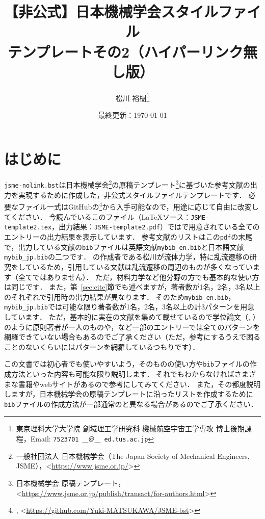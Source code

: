 \documentclass[a4paper,fleqn,uplatex,dvipdfmx]{jsarticle}
\title{【非公式】日本機械学会\BibTeX{}スタイルファイル \\ \JSMErepos テンプレートその2（ハイパーリンク無し版）}
\author{松川 裕樹\thanks{東京理科大学大学院 創域理工学研究科 機械航空宇宙工学専攻 博士後期課程，Email: \texttt{7523701 ＿＠＿ ed.tus.ac.jp}}}
\date{最終更新：\today}
\newcommand{\jsmefile}{\texttt{jsme-nolink.bst}}
\begin{document}
\maketitle
\thispagestyle{cover}

\vspace{-5mm}
\tableofcontents

\section{はじめに}
\label{sec:introduction}
\jsmefile は日本機械学会\footnote{一般社団法人 日本機械学会（The Japan Society of Mechanical Engineers, JSME），\textless\url{https://www.jsme.or.jp/}\textgreater}の原稿テンプレート\footnote{日本機械学会 原稿テンプレート，\textless\url{https://www.jsme.or.jp/publish/transact/for-authors.html}\textgreater}に基づいた参考文献の出力を実現するために作成した，非公式\BibTeX{}スタイルファイルテンプレートです．
必要なファイル一式はGitHubの\JSMErepos\footnote{\JSMErepos, \textless\url{https://github.com/Yuki-MATSUKAWA/JSME-bst}\textgreater}から入手可能なので，用途に応じて自由に改変してください．
今読んでいるこのファイル（\LaTeX{}ソース：\verb|JSME-template2.tex|，出力結果：\verb|JSME-template2.pdf|）では\BibTeX{}で用意されている全てのエントリーの出力結果を表示しています．
参考文献のリストはこの\verb|pdf|の末尾で，出力している文献の\verb|bib|ファイルは英語文献\verb|mybib_en.bib|と日本語文献\verb|mybib_jp.bib|の二つです．
\JSMErepos の作成者である松川が流体力学，特に乱流遷移の研究をしているため，引用している文献は乱流遷移の周辺のものが多くなっています（全てではありません）．
ただ，材料力学など他分野の方でも基本的な使い方は同じです．
また，第~\ref{sec:cite}節でも述べますが，著者数が1名，2名，3名以上のそれぞれで引用時の出力結果が異なります．
そのため\verb|mybib_en.bib|，\verb|mybib_jp.bib|では可能な限り著者数が1名，2名，3名以上の計3パターンを用意しています．
ただ，基本的に実在の文献を集めて載せているので学位論文（\ttphdthesis, \ttmastersthesis）のように原則著者が一人のものや\ttmanual，\ttunpublished など一部のエントリーでは全てのパターンを網羅できていない場合もあるのでご了承ください（ただ，参考にするうえで困ることのないくらいにはパターンを網羅しているつもりです）．

この文書では\BibTeX{}初心者でも使いやすいよう，\BibTeX{}そのものの使い方や\verb|bib|ファイルの作成方法といった内容も可能な限り説明します．
それでもわからなければさまざまな書籍やwebサイトがあるので参考にしてみてください．
また，その都度説明しますが，日本機械学会の原稿テンプレートに沿ったリストを作成するために\verb|bib|ファイルの作成方法が一部通常の\BibTeX{}と異なる場合があるのでご了承ください．
\end{document}
